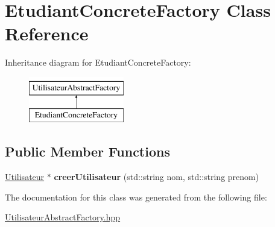 \hypertarget{classEtudiantConcreteFactory}{\section{Etudiant\-Concrete\-Factory Class Reference}
\label{classEtudiantConcreteFactory}
}
Inheritance diagram for Etudiant\-Concrete\-Factory\-:\begin{figure}[H]
\begin{center}
\leavevmode
\includegraphics[height=2.000000cm]{classEtudiantConcreteFactory}
\end{center}
\end{figure}
\subsection*{Public Member Functions}
\begin{DoxyCompactItemize}
\item 
\hypertarget{classEtudiantConcreteFactory_a09792abdb4be6bf063d80d5fd9532075}{\hyperlink{classUtilisateur}{Utilisateur} $\ast$ {\bfseries creer\-Utilisateur} (std\-::string nom, std\-::string prenom)}\label{classEtudiantConcreteFactory_a09792abdb4be6bf063d80d5fd9532075}

\end{DoxyCompactItemize}


The documentation for this class was generated from the following file\-:\begin{DoxyCompactItemize}
\item 
\hyperlink{UtilisateurAbstractFactory_8hpp}{Utilisateur\-Abstract\-Factory.\-hpp}\end{DoxyCompactItemize}
